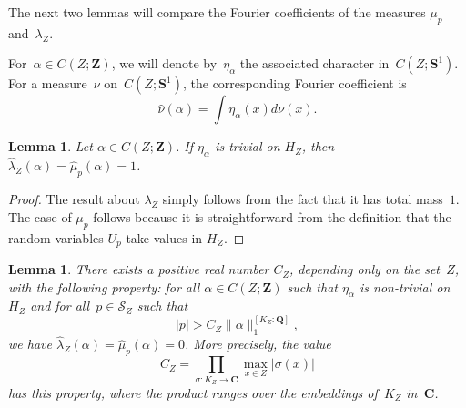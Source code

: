 \documentclass[12pt]{amsart}
\renewcommand{\mathcal}{\mathscr}
\newcommand{\Cc}{\mathbf{C}}
\newcommand{\Zz}{\mathbf{Z}}
\newcommand{\Ss}{\mathbf{S}}
\newcommand{\Qq}{\mathbf{Q}}
\renewcommand{\hat}{\widehat}
\theoremstyle{plain}
\newtheorem{lemma}[theorem]{Lemma}
\theoremstyle{remark}
\theoremstyle{definition}
\newcommand{\mcS}{\mathcal{S}}
\begin{document}
The next two lemmas will compare the Fourier coefficients of the
measures $\mu_p$ and~$\lambda_Z$.

For~$\alpha\in C(Z;\Zz)$, we will denote by~$\eta_{\alpha}$ the
associated character in~$C(Z;\Ss^1)$. For a measure~$\nu$
on~$C(Z;\Ss^1)$, the corresponding Fourier coefficient is
\[
  \widehat{\nu}(\alpha)=\int \eta_{\alpha}(x)d\nu(x).
\]

\begin{lemma}\label{lem: vanishing triv}
  Let $\alpha \in C(Z; \Zz)$. If $\eta_\alpha$ is trivial on $H_Z$, then
  $\hat{\lambda}_Z(\alpha) = \hat{\mu}_p(\alpha)= 1$.
\end{lemma}

\begin{proof}
  The result about $\lambda_Z$ simply follows from the fact that it has
  total mass~$1$. The case of $\mu_p$ follows because it is
  straightforward from the definition that the random variables $U_p$
  take values in $H_Z$.
\end{proof}

\begin{lemma}\label{lem: vanishing nontriv}
  There exists a positive real number $C_Z$, depending only on the
  set~$Z$, with the following property\textup{:} for all
  $\alpha \in C(Z; \Zz)$ such that $\eta_\alpha$ is non-trivial on
  $H_Z$ and for all~$p\in \mcS_Z$ such that
  \[
    |p| > C_Z \|\alpha \|_{1}^{[K_Z: \Qq]},
  \]
  we have $\hat{\lambda}_Z(\alpha) = \widehat{\mu}_p(\alpha)=0$.
  More precisely, the value
  \begin{equation}\label{eq-cg}
    C_Z= \prod_{\sigma \colon K_Z\to\Cc}\max_{ x \in Z}
    |\sigma(x) |
  \end{equation}
  has this property, where the product ranges over the embeddings
  of~$K_Z$ in~$\Cc$.
\end{lemma}
\end{document}
